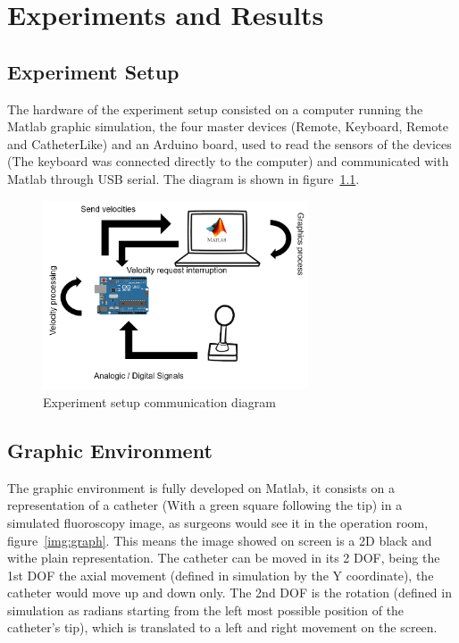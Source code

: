 
\chapter{Experiments and Results}\label{sec:experiments}

\section{Experiment Setup}\label{sec:setup}
The hardware of the experiment setup consisted on a computer running the Matlab graphic simulation, the four master devices (Remote, Keyboard, Remote and CatheterLike) and an Arduino board, used to read the sensors of the devices (The keyboard was connected directly to the computer) and communicated with Matlab through USB serial. The diagram is shown in figure~\ref{img:expsetup}.\\

\begin{figure}[ht]
   \centering
   \includegraphics[width=0.7\textwidth]{img/expsetup.PNG}
   \caption{Experiment setup communication diagram}
   \label{img:expsetup}
\end{figure}

\section{Graphic Environment}\label{sec:environment}
The graphic environment is fully developed on Matlab, it consists on a representation of a catheter (With a green square following the tip) in a simulated fluoroscopy image, as surgeons would see it in the operation room, figure~\ref{img:graph}. This means the image showed on screen is a 2D black and withe plain representation. The catheter can be moved in its 2 DOF, being the 1st DOF the axial movement (defined in simulation by the Y coordinate), the catheter would move up and down only. The 2nd DOF is the rotation (defined in simulation as radians starting from the left most possible position of the catheter's tip), which is translated to a left and right movement on the screen.\\

